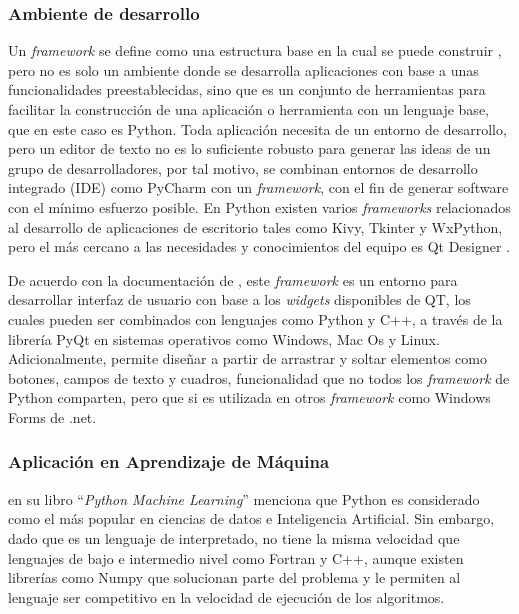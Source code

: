 \subsubsection{Ambiente de desarrollo}
Un \textit{framework} se define como una estructura base en la cual se puede construir \parencite{CambridgeDefFramework}, pero no es solo un ambiente donde se desarrolla aplicaciones con base a unas funcionalidades preestablecidas, sino que es un conjunto de herramientas para facilitar la construcción de una aplicación o herramienta con un lenguaje base, que en este caso es Python. Toda aplicación necesita de un entorno de desarrollo, pero un editor de texto no es lo suficiente robusto para generar las ideas de un grupo de desarrolladores, por tal motivo, se combinan entornos de desarrollo integrado (IDE) como PyCharm con un \textit{framework}, con el fin de generar software con el mínimo esfuerzo posible. En Python existen varios \textit{frameworks} relacionados al desarrollo de aplicaciones de escritorio tales como Kivy, Tkinter y WxPython, pero el más cercano a las necesidades y conocimientos del equipo es Qt Designer \parencite{QTDes}. 

De acuerdo con la documentación de \textcite{QTDesDoc}, este \textit{framework} es un entorno para desarrollar interfaz de usuario con base a los \textit{widgets} disponibles de QT, los cuales pueden ser combinados con lenguajes como Python y C++, a través de la librería PyQt en sistemas operativos como Windows, Mac Os y Linux. Adicionalmente, permite diseñar a partir de arrastrar y soltar elementos como botones, campos de texto y cuadros, funcionalidad que no todos los \textit{framework} de Python comparten, pero que si es utilizada en otros \textit{framework} como Windows Forms de .net.

\subsubsection{Aplicación en Aprendizaje de Máquina}
\textcite{raschka2015python} en su libro ``\textit{Python Machine Learning}'' menciona que Python es considerado como el más popular en ciencias de datos e Inteligencia Artificial. Sin embargo, dado que es un lenguaje de interpretado, no tiene la misma velocidad que lenguajes de bajo e intermedio nivel como Fortran y C++, aunque existen librerías como Numpy que solucionan parte del problema y le permiten al lenguaje ser competitivo en la velocidad de ejecución de los algoritmos.

